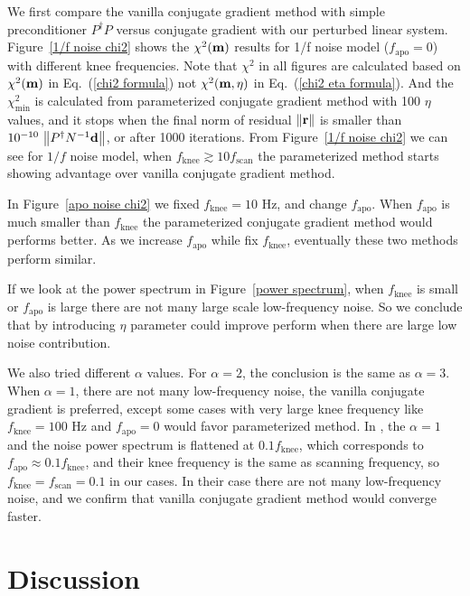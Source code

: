 \documentclass[twocolumn,linenumbers]{aastex631}
\newcommand{\vbd}{\vb{d}}
\newcommand{\vbm}{\vb{m}}
\newcommand{\Pdagger}{P^{\dagger}}
\begin{document}
We first compare the vanilla conjugate gradient method with
simple preconditioner $\Pdagger P$ versus conjugate gradient with our perturbed linear system.
Figure~\ref{1/f noise chi2} shows the $\chi^2(\vbm)$ results for 1/f noise model ($f_\text{apo}=0$)
with different knee frequencies.
Note that $\chi^2$ in all figures are calculated based on $\chi^2(\vbm)$ in Eq.~(\ref{chi2 formula})
not $\chi^2(\vbm, \eta)$ in Eq.~(\ref{chi2 eta formula}).
And the $\chi^2_{\text{min}}$ is calculated from parameterized conjugate gradient
method with 100 $\eta$ values, and it stops when the final norm of residual $\norm{\vb{r}}$
is smaller than $10^{-10}\ \norm{\Pdagger N^{-1} \vbd}$, or after 1000 iterations.
From Figure~\ref{1/f noise chi2} we can see for $1/f$ noise model,
when $f_\text{knee} \gtrsim 10 f_\text{scan}$ the parameterized method starts showing advantage
over vanilla conjugate gradient method.


In Figure~\ref{apo noise chi2} we fixed $f_\text{knee}=10$ Hz, and change $f_\text{apo}$.
When $f_\text{apo}$ is much smaller than $f_\text{knee}$ the parameterized conjugate gradient method would
performs better.
As we increase $f_\text{apo}$ while fix $f_\text{knee}$, eventually these two methods perform similar.

If we look at the power spectrum in Figure~\ref{power spectrum},
when $f_\text{knee}$ is small or $f_\text{apo}$ is large there are not many
large scale low-frequency noise.
So we conclude that by introducing $\eta$ parameter could improve perform when there are large low noise
contribution.


We also tried different $\alpha$ values. For $\alpha=2$, the conclusion is the
same as $\alpha=3$. When $\alpha=1$, there are not many low-frequency noise, 
the vanilla conjugate gradient is preferred, except some cases with very large
knee frequency like $f_\text{knee} = 100$ Hz and $f_\text{apo}=0$ would favor
parameterized method.
In \citealt{2018A&A...620A..59P}, the $\alpha = 1$ and  the noise power spectrum is flattened at $0.1f_\text{knee}$,
which corresponds to $f_\text{apo} \approx 0.1 f_\text{knee}$,
and their knee frequency is the same as scanning frequency, so $f_\text{knee}=f_\text{scan}=0.1$ 
in our cases.
In their case there are not many low-frequency noise,
and we confirm that vanilla conjugate gradient method would converge faster.



\section{Discussion} \label{sec:discussion}
\end{document}

